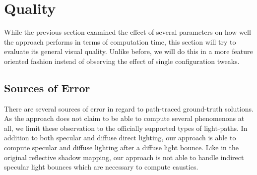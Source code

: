 \documentclass[thesis.tex]{subfiles}
\begin{document}

\newpage



\section{Quality}
While the previous section examined the effect of several parameters on how well the approach performs in terms of computation time, this section will try to evaluate its general visual quality.
Unlike before, we will do this in a more feature oriented fashion instead of observing the effect of single configuration tweaks. 

\subsection{Sources of Error} \label{sec:eva:errorsources}
There are several sources of error in regard to path-traced ground-truth solutions.
As the approach does not claim to be able to compute several phenomenons at all, we limit these observation to the officially supported types of light-paths.
In addition to both specular and diffuse direct lighting, our approach is able to compute specular and diffuse lighting after a diffuse light bounce.
Like in the original reflective shadow mapping, our approach is not able to handle indirect specular light bounces which are necessary to compute caustics.
\end{document}
